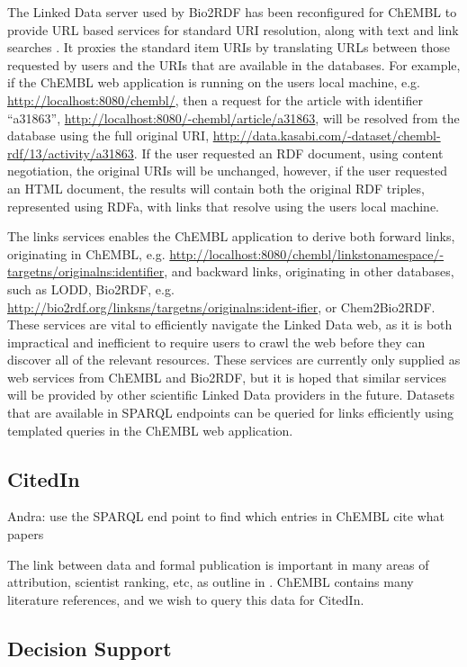 \documentclass[sw]{iosart2c}
\begin{document}
The Linked Data server used by Bio2RDF has been reconfigured for ChEMBL to provide URL
based services for standard URI resolution, along with text and link searches
\cite{WebAppGitHub}. It proxies the standard item
URIs by translating URLs between those requested by users and the URIs that are available
in the databases. For example, if the ChEMBL web application is running on the users
local machine, e.g. \url{http://localhost:8080/chembl/}, then a request for the
article with identifier ``a31863'', \url{http://localhost:8080/-chembl/article/a31863},
will be resolved from the database using the full original URI,
\url{http://data.kasabi.com/-dataset/chembl-rdf/13/activity/a31863}. If the
user requested an RDF document, using content negotiation, the original URIs will be unchanged,
however, if the user requested an HTML document, the results will contain both the
original RDF triples, represented using RDFa, with links that resolve using the users local machine.

The links services enables the ChEMBL application to derive both forward links, originating in
ChEMBL, e.g. \url{http://localhost:8080/chembl/linkstonamespace/-targetns/originalns:identifier},
and backward links, originating in other databases, such as LODD, Bio2RDF, e.g.
\url{http://bio2rdf.org/linksns/targetns/originalns:ident-ifier}, or Chem2Bio2RDF.
These services are vital to efficiently navigate the Linked Data web, as it is both
impractical and inefficient to require users to crawl the web before they can discover all of the
relevant resources. These services are currently only supplied as web services from ChEMBL and
Bio2RDF, but it is hoped that similar services will be provided by other scientific Linked Data
providers in the future. Datasets that are available in SPARQL endpoints can be queried for
links efficiently using templated queries in the ChEMBL web application.

\subsection{CitedIn}

Andra: use the SPARQL end point to find which entries in ChEMBL cite what papers
 
The link between data and formal publication is important in many areas of
attribution, scientist ranking, etc, as outline in \cite{Waagmeester2012}.
ChEMBL contains many literature references, and we wish to query this data
for CitedIn.

\subsection{Decision Support}
\end{document}
